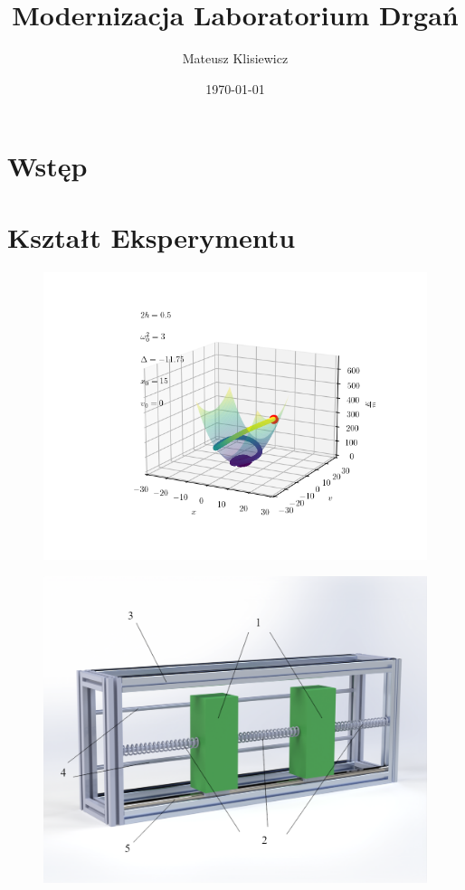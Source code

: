\documentclass[12pt]{article}
\title{Modernizacja Laboratorium Drgań}
\author{Mateusz Klisiewicz}
\date{\today}
\title{\mytitle \\
  \large \mysubtitle}
\begin{document}
\pagestyle{fancy}
\maketitle
\newpage
\section{Wstęp}
\section{Kształt Eksperymentu}
\begin{figure}[h]
\includegraphics[width=16cm]{phase_plane_example}
\end{figure}
\begin{figure}[h]
\includegraphics[width=16cm]{2dof_sch}
\end{figure}
\end{document}
